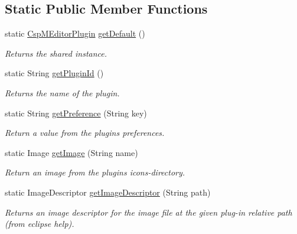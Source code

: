 \subsection*{Static Public Member Functions}
\begin{DoxyCompactItemize}
\item 
static \hyperlink{classcom_1_1fware_1_1cspdt_1_1cspm_1_1editor_1_1_csp_m_editor_plugin}{Csp\+M\+Editor\+Plugin} \hyperlink{classcom_1_1fware_1_1cspdt_1_1cspm_1_1editor_1_1_csp_m_editor_plugin_a5809344c36c4947f0f4cbe01d7daf633}{get\+Default} ()
\begin{DoxyCompactList}\small\item\em Returns the shared instance. \end{DoxyCompactList}\item 
static String \hyperlink{classcom_1_1fware_1_1cspdt_1_1cspm_1_1editor_1_1_csp_m_editor_plugin_a3108b6f331629b6acb68b8f9e7987fd0}{get\+Plugin\+Id} ()
\begin{DoxyCompactList}\small\item\em Returns the name of the plugin. \end{DoxyCompactList}\item 
static String \hyperlink{classcom_1_1fware_1_1cspdt_1_1cspm_1_1editor_1_1_csp_m_editor_plugin_a7d802c2a09d9e2a3fd8c69f76485e19f}{get\+Preference} (String key)
\begin{DoxyCompactList}\small\item\em Return a value from the plugin\textquotesingle{}s preferences. \end{DoxyCompactList}\item 
static Image \hyperlink{classcom_1_1fware_1_1cspdt_1_1cspm_1_1editor_1_1_csp_m_editor_plugin_a617d7093508af7b8925513888ba9abaa}{get\+Image} (String name)
\begin{DoxyCompactList}\small\item\em Return an image from the plugin\textquotesingle{}s icons-\/directory. \end{DoxyCompactList}\item 
static Image\+Descriptor \hyperlink{classcom_1_1fware_1_1cspdt_1_1cspm_1_1editor_1_1_csp_m_editor_plugin_ac421550bc116a9d99997fa22d1fd45ab}{get\+Image\+Descriptor} (String path)
\begin{DoxyCompactList}\small\item\em Returns an image descriptor for the image file at the given plug-\/in relative path (from eclipse help). \end{DoxyCompactList}\item 

\end{DoxyCompactItemize}

